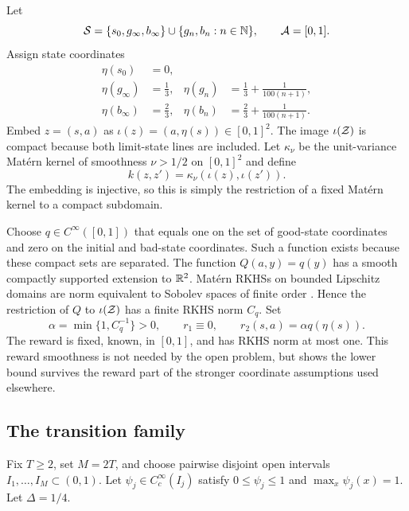 Let
\begin{equation}
 \mathcal S=\{s_0,g_\infty,b_\infty\}
 \cup\{g_n,b_n:n\in\mathbb N\},
 \qquad \mathcal A=[0,1].
\end{equation}
Assign state coordinates
\begin{align}
 \eta(s_0)&=0,\\
 \eta(g_\infty)&=\tfrac13,
 &\eta(g_n)&=\tfrac13+\frac{1}{100(n+1)},\\
 \eta(b_\infty)&=\tfrac23,
 &\eta(b_n)&=\tfrac23+\frac{1}{100(n+1)}.
\end{align}
Embed $z=(s,a)$ as $\iota(z)=(a,\eta(s))\in[0,1]^2$. The image $\iota(\mathcal Z)$
is compact because both limit-state lines are included. Let $\kappa_\nu$ be the
unit-variance Mat\'ern kernel of smoothness $\nu>1/2$ on $[0,1]^2$ and define
\begin{equation}
 k(z,z')=\kappa_\nu(\iota(z),\iota(z')).
 \label{eq:matern-pullback}
\end{equation}
The embedding is injective, so this is simply the restriction of a fixed Mat\'ern
kernel to a compact subdomain.

Choose $q\in C^\infty([0,1])$ that equals one on the set of good-state
coordinates and zero on the initial and bad-state coordinates. Such a function
exists because these compact sets are separated. The function
$Q(a,y)=q(y)$ has a smooth compactly supported extension to $\mathbb R^2$. Mat\'ern RKHSs
on bounded Lipschitz domains are norm equivalent to Sobolev spaces of finite order
\citep{wendland2005scattered,kanagawa2018review}. Hence the restriction of $Q$ to
$\iota(\mathcal Z)$ has a finite RKHS norm $C_q$. Set
\begin{equation}
 \alpha=\min\{1,C_q^{-1}\}>0,
 \qquad r_1\equiv0,
 \qquad r_2(s,a)=\alpha q(\eta(s)).
 \label{eq:fixed-reward}
\end{equation}
The reward is fixed, known, in $[0,1]$, and has RKHS norm at most one. This reward
smoothness is not needed by the open problem, but shows the lower bound survives
the reward part of the stronger coordinate assumptions used elsewhere.

\subsection{The transition family}

Fix $T\geq2$, set $M=2T$, and choose pairwise disjoint open intervals
$I_1,\ldots,I_M\subset(0,1)$. Let
$\psi_j\in C_c^\infty(I_j)$ satisfy $0\leq\psi_j\leq1$ and
$\max_x\psi_j(x)=1$. Let $\Delta=1/4$.

